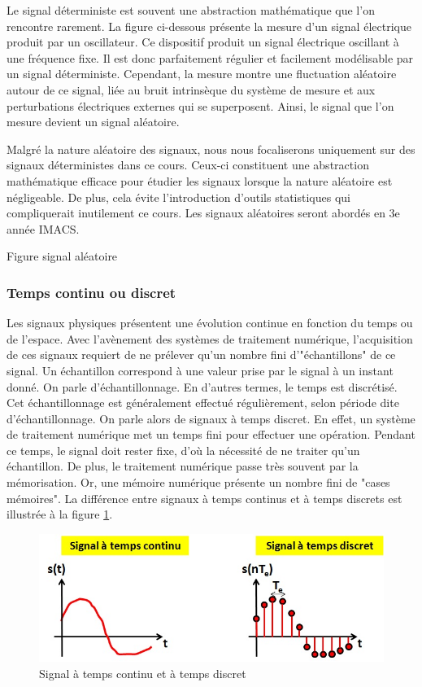 	Le signal déterministe est souvent une abstraction mathématique que l'on rencontre rarement. La figure ci-dessous présente la mesure d'un signal électrique produit par un oscillateur. Ce dispositif produit un signal électrique oscillant à une fréquence fixe. Il est donc parfaitement régulier et facilement modélisable par un signal déterministe. Cependant, la mesure montre une fluctuation aléatoire autour de ce signal, liée au bruit intrinsèque du système de mesure et aux perturbations électriques externes qui se superposent. Ainsi, le signal que l'on mesure devient un signal aléatoire.   
		
	Malgré la nature aléatoire des signaux, nous nous focaliserons uniquement sur des signaux déterministes dans ce cours. Ceux-ci constituent une abstraction mathématique efficace pour étudier les signaux lorsque la nature aléatoire est négligeable. De plus, cela évite l'introduction d'outils statistiques qui compliquerait inutilement ce cours. Les signaux aléatoires seront abordés en 3e année IMACS.


	Figure signal aléatoire

	\subsubsection{Temps continu ou discret}
	Les signaux physiques présentent une évolution continue en fonction du temps ou de l'espace. Avec l'avènement des systèmes de traitement numérique, l'acquisition de ces signaux requiert de ne prélever qu'un nombre fini d'"échantillons" de ce signal. Un échantillon correspond à une valeur prise par le signal à un instant donné. On parle d'échantillonnage. En d'autres termes, le temps est discrétisé. Cet échantillonnage est généralement effectué régulièrement, selon période dite d'échantillonnage.
	On parle alors de signaux à temps discret. En effet, un système de traitement numérique met un temps fini pour effectuer une opération. Pendant ce temps, le signal doit rester fixe, d'où la nécessité de ne traiter qu'un échantillon. De plus, le traitement numérique passe très souvent par la mémorisation. Or, une mémoire numérique présente un nombre fini de "cases mémoires". La différence entre signaux à temps continus et à temps discrets est illustrée à la figure \ref{Fig:Signal_tps_continu_discret}.
	
	\begin{figure}[h!]
		\centering
		\includegraphics[scale=0.5]{images/Signal_tps_continu_discret.jpg} 
		\caption{Signal à temps continu et à temps discret}	
		\label{Fig:Signal_tps_continu_discret}
	\end{figure}
	
